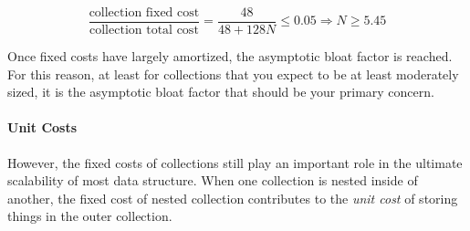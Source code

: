$$\frac{\textrm{collection fixed cost}}{\textrm{collection total cost}} =
\frac{48}{48 + 128 N} \le 0.05 \Longrightarrow N \ge 5.45$$

Once fixed costs have largely amortized, the asymptotic bloat factor is reached.
For this reason, at least for collections that you expect to be at least
moderately sized, it is the asymptotic bloat factor that should be your primary
concern.

\paragraph{Unit Costs}
However, the fixed costs of collections still play an important role in the
ultimate scalability of most data structure. When one collection is nested
inside of another, the fixed cost of nested collection contributes to the
\emph{unit cost} of storing things in the outer collection.



